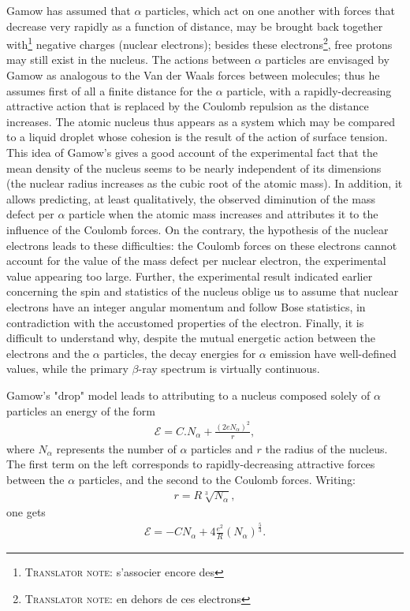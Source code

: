 \documentclass[a4paper,11pt]{article}
\newcommand{\?}[2]{#1\footnote{\textsc{Translator note}: #2}}
\newcommand{\nequ}[2]{\begin{align*}\tag{#1}#2\end{align*}}
\newcommand{\uequ}[1]{\begin{align*}#1\end{align*}}
\begin{document}
Gamow has assumed that $\alpha$ particles, which act on one another with forces that decrease very rapidly as a function of distance, may \?{be brought back together with}{s'associer encore des} negative charges (nuclear electrons); \?{besides these electrons}{en dehors de ces electrons}, free protons may still exist in the nucleus. The actions between $\alpha$ particles are envisaged by Gamow as analogous to the Van der Waals forces between molecules; thus he assumes first of all a finite distance for the $\alpha$ particle, with a rapidly-decreasing attractive action that is replaced by the Coulomb repulsion as the distance increases. The atomic nucleus thus appears as a system which may be compared to a liquid droplet whose cohesion is the result of the action of surface tension. This idea of Gamow's gives a good account of the experimental fact that the mean density of the nucleus seems to be nearly independent of its dimensions (the nuclear radius increases as the cubic root of the atomic mass). In addition, it allows predicting, at least qualitatively, the observed diminution of the mass defect per $\alpha$ particle when the atomic mass increases and attributes it to the influence of the Coulomb forces. On the contrary, the hypothesis of the nuclear electrons leads to these difficulties: the Coulomb forces on these electrons cannot account for the value of the mass defect per nuclear electron, the experimental value appearing too large. Further, the experimental result indicated earlier concerning the spin and statistics of the nucleus oblige us to assume that nuclear electrons have an integer angular momentum and follow Bose statistics, in contradiction with the accustomed properties of the electron. Finally, it is difficult to understand why, despite the mutual energetic action between the electrons and the $\alpha$ particles, the decay energies for $\alpha$ emission have well-defined values, while the primary $\beta$-ray spectrum is virtually continuous.

Gamow's "drop" model leads to attributing to a nucleus composed solely of $\alpha$ particles an energy of the form
\nequ{7}{
\mathcal{E} = C.N_\alpha + \frac{(2eN_\alpha)^2}{r},
}
where $N_\alpha$ represents the number of $\alpha$ particles and $r$ the radius of the nucleus. The first term on the left corresponds to rapidly-decreasing attractive forces between the $\alpha$ particles, and the second to the Coulomb forces. Writing:
\uequ{
r=R\sqrt[3]{N_\alpha},
}
one gets
\nequ{8}{
\mathcal{E} = -CN_\alpha + 4\frac{e^2}{R}(N_\alpha)^\frac{5}{3}.
}
\end{document}
